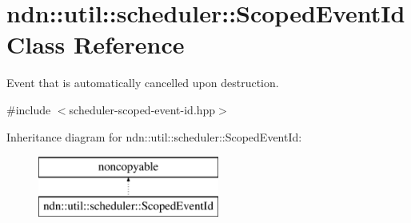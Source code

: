 \hypertarget{classndn_1_1util_1_1scheduler_1_1ScopedEventId}{}\section{ndn\+:\+:util\+:\+:scheduler\+:\+:Scoped\+Event\+Id Class Reference}
\label{classndn_1_1util_1_1scheduler_1_1ScopedEventId}


Event that is automatically cancelled upon destruction.  




{\ttfamily \#include $<$scheduler-\/scoped-\/event-\/id.\+hpp$>$}

Inheritance diagram for ndn\+:\+:util\+:\+:scheduler\+:\+:Scoped\+Event\+Id\+:\begin{figure}[H]
\begin{center}
\leavevmode
\includegraphics[height=2.000000cm]{classndn_1_1util_1_1scheduler_1_1ScopedEventId}
\end{center}
\end{figure}
